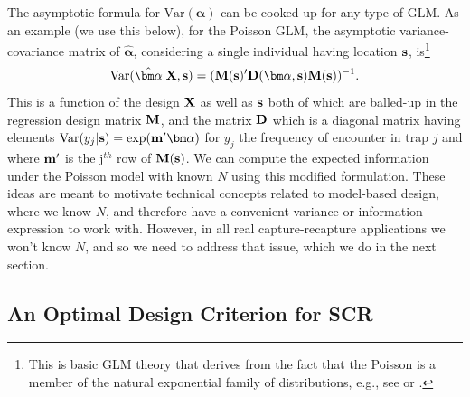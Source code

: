 The asymptotic formula for $\mbox{Var}( {\bm \alpha})$ can be cooked
up for any type of GLM. As an example (we use this below), for the
Poisson GLM, the asymptotic variance-covariance matrix of $\hat{\bm
  \alpha}$, considering a single individual having location ${\bf s}$,
is\footnote{ This is basic GLM theory that derives from the fact that
  the Poisson is a member of the natural exponential family of
  distributions, e.g., see \citet{mccullagh_nelder:1989} or
  \citet{agresti:2002}.}
\begin{equation}
  \mbox{Var}(\hat{\bm \alpha}|{\bf X},{\bf s})
=  ({\bf M}({\bf s})' {\bf D}({\bm \alpha},{\bf s}){\bf M}({\bf s}))^{-1}.
\label{eq.varalpha}
\end{equation}
This is a function of the design ${\bf X}$ as well as ${\bf s}$ both
of which are balled-up in the regression design matrix ${\bf M}$, and
the matrix ${\bf D}$ which is a diagonal matrix having elements
$\mbox{Var}( y_{j}|{\bf s}) = \exp({\bf m}'{\bm \alpha})$ for $y_{j}$
the frequency of encounter in trap $j$ and where ${\bf m}'$ is the j$^{th}$ row
of ${\bf M}({\bf s})$. 
We can compute the expected
information under the Poisson model with known $N$ using this modified
formulation.  These ideas are meant to motivate technical concepts
related to model-based design, where we know $N$, and therefore have a
convenient variance or information expression to work with. However,
in all real capture-recapture applications we won't know $N$, and so
we need to address that issue, which we do in the next section.



\subsection{An Optimal Design Criterion for SCR}

